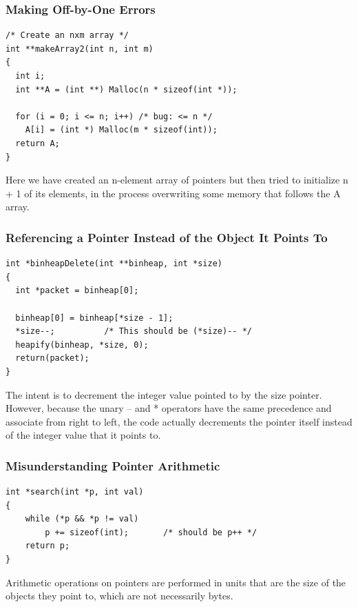 \documentclass[11pt]{article}
\begin{document}
\subsubsection{Making Off-by-One Errors}
\label{sec:orgeff093d}
\begin{verbatim}
/* Create an nxm array */
int **makeArray2(int n, int m)
{
  int i;
  int **A = (int **) Malloc(n * sizeof(int *));

  for (i = 0; i <= n; i++) /* bug: <= n */
    A[i] = (int *) Malloc(m * sizeof(int));
  return A;
}

\end{verbatim}
Here we have created an n-element array of pointers but then tried to initialize n + 1 of its elements, in the process overwriting some memory that follows the A array.\\

\subsubsection{Referencing a Pointer Instead of the Object It Points To}
\label{sec:org4295d99}
\begin{verbatim}
int *binheapDelete(int **binheap, int *size)
{
  int *packet = binheap[0];

  binheap[0] = binheap[*size - 1];
  *size--;			/* This should be (*size)-- */
  heapify(binheap, *size, 0);
  return(packet);
}

\end{verbatim}

The intent is to decrement the integer value pointed to by the size pointer. However, because the unary -- and * operators have the same precedence and associate from right to left, the code actually decrements the pointer itself instead of the integer value that it points to.\\


\subsubsection{Misunderstanding Pointer Arithmetic}
\label{sec:org64ecb52}
\begin{verbatim}
int *search(int *p, int val)
{
    while (*p && *p != val)
        p += sizeof(int); 		/* should be p++ */
    return p;
}

\end{verbatim}

Arithmetic operations on pointers are performed in units that are the size of the objects they point to, which are not necessarily bytes.\\
\end{document}

